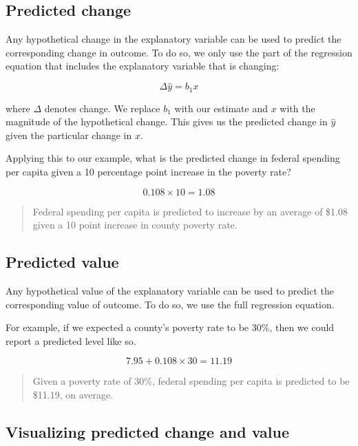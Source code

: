 \documentclass[
]{book}
\begin{document}
\hypertarget{predicted-change}{%
\subsection{Predicted change}\label{predicted-change}}

Any hypothetical change in the explanatory variable can be used to predict the corresponding change in outcome. To do so, we only use the part of the regression equation that includes the explanatory variable that is changing:

\begin{equation}
\Delta \hat{y}=b_1x
\label{eq:predchange}
\end{equation}

where \(\Delta\) denotes change. We replace \(b_1\) with our estimate and \(x\) with the magnitude of the hypothetical change. This gives us the predicted change in \(\hat{y}\) given the particular change in \(x\).

Applying this to our example, what is the predicted change in federal spending per capita given a 10 percentage point increase in the poverty rate?

\[0.108 \times 10 = 1.08\]

\begin{quote}
Federal spending per capita is predicted to increase by an average of \$1.08 given a 10 point increase in county poverty rate.
\end{quote}

\hypertarget{predicted-value}{%
\subsection{Predicted value}\label{predicted-value}}

Any hypothetical value of the explanatory variable can be used to predict the corresponding value of outcome. To do so, we use the full regression equation.

For example, if we expected a county's poverty rate to be 30\%, then we could report a predicted level like so.

\[7.95 + 0.108 \times 30 = 11.19\]

\begin{quote}
Given a poverty rate of 30\%, federal spending per capita is predicted to be \$11.19, on average.
\end{quote}

\hypertarget{visualizing-predicted-change-and-value}{%
\subsection{Visualizing predicted change and value}\label{visualizing-predicted-change-and-value}}
\end{document}
